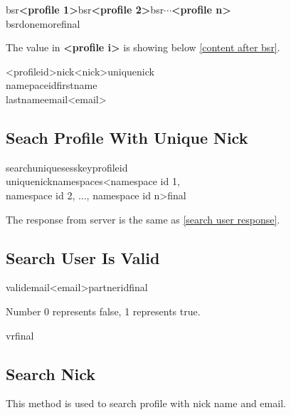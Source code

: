 \documentclass[oneside,titlepage,a4paper]{Definition/retrospy} %
\begin{document}
\ServerResponse

\begin{mybox}[label = search user response]
	\tbs bsr\tbs\textbf{<profile 1>}\tbs bsr\tbs\textbf{<profile 2>}\tbs bsr\tbs $\cdots$\tbs \textbf{<profile n>}\\
	\tbs bsrdone\tbs\tbs more\tbs<number of rest profiles>\tbs final\tbs
\end{mybox}
The value in \textbf{<profile i>} is showing below \ref{content after bsr}.
\begin{mybox}[label = content after bsr]
<profileid>\tbs nick\tbs<nick>\tbs uniquenick\\\tbs namepaceid\tbs firstname\\\tbs lastname\tbs email\tbs<email>
\end{mybox}
\subsection{Seach Profile With Unique Nick}
\ClientRequest
\begin{mybox}
	\tbs searchunique\tbs\tbs sesskey\tbs<session key>\tbs profileid\tbs<profile id>\\\tbs uniquenick\tbs<unique nick>\tbs namespaces\tbs<namespace id 1,\\ namespace id 2, ..., namespace id n>\tbs final\tbs
\end{mybox}
\ServerResponse
The response from server is the same as \ref{search user response}.
\subsection{Search User Is Valid}
\ClientRequest

\begin{mybox}
	\tbs valid\tbs\tbs email\tbs<email>\tbs partnerid\tbs<partner id>\tbs final\tbs
\end{mybox}

\ServerResponse

Number 0 represents false, 1 represents true.
\begin{mybox}
	\tbs vr\tbs <valid code: 0 or 1>\tbs final \tbs
\end{mybox}

\subsection{Search Nick}
This method is used to search profile with nick name and email.
\ClientRequest
\end{document}
